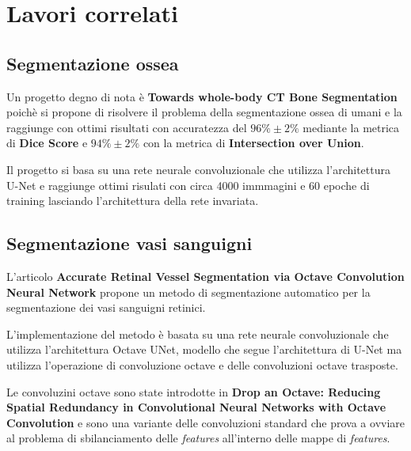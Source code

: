 \chapter{Lavori correlati} %
\label{chap:Lavori correlati}

\section{Segmentazione ossea}


Un progetto degno di nota \`e \textbf{Towards whole-body CT Bone Segmentation} \cite{Klein_2018}
poich\`e si propone di risolvere il problema della segmentazione ossea di umani e la raggiunge con
ottimi risultati con accuratezza del $96\%\pm 2\%$ mediante la metrica di \textbf{Dice Score} e $94\%\pm 2\%$ con la metrica di \textbf{Intersection over Union}.


Il progetto si basa su una rete neurale convoluzionale che utilizza l'architettura U-Net \cite{ronneberger2015unet}
e raggiunge ottimi risulati con circa 4000 immmagini e 60 epoche di training lasciando
l'architettura della rete invariata.


\section{Segmentazione vasi sanguigni}
L'articolo \textbf{Accurate Retinal Vessel Segmentation via
Octave Convolution Neural Network} \cite{fan2019octave} propone un metodo di segmentazione automatico per la segmentazione dei vasi sanguigni retinici.

L'implementazione del metodo \`e basata su una rete neurale convoluzionale che utilizza l'architettura Octave UNet, modello che segue l'architettura di U-Net \cite{ronneberger2015unet} ma utilizza l'operazione di convoluzione octave e delle convoluzioni octave trasposte.

Le convoluzini octave sono state introdotte in \textbf{Drop an Octave: Reducing Spatial Redundancy in Convolutional Neural Networks with Octave Convolution} \cite{chen2019drop} e sono una variante delle convoluzioni standard che prova a ovviare al problema di sbilanciamento delle \textit{features} all'interno delle mappe di \textit{features}.





